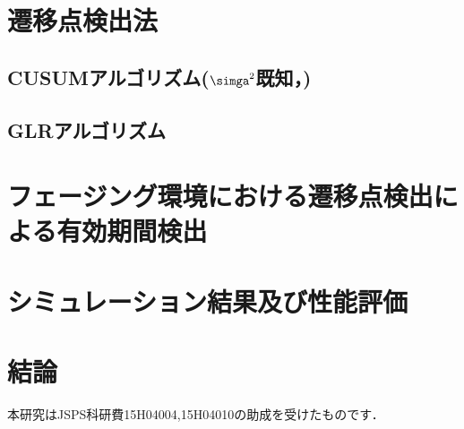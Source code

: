 \documentclass[technicalreport]{ieicej}
\begin{document}
\section{遷移点検出法}
\label{sec:transition}

\subsection{CUSUMアルゴリズム($\simga^2$既知，)}

\subsection{GLRアルゴリズム}

\section{フェージング環境における遷移点検出による有効期間検出}
\label{sec:propose}


\section{シミュレーション結果及び性能評価}
\label{sec:result}

\section{結論}
\label{sec:conclusion}

\ack

本研究はJSPS科研費15H04004,15H04010の助成を受けたものです．
\end{document}
